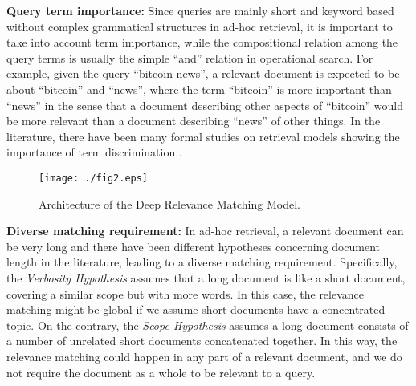 \documentclass{sig-alternate-05-2015}
\begin{document}
\textbf{Query term importance:} Since queries are mainly short and keyword based without complex grammatical structures in ad-hoc retrieval, it is important to take into account term importance, while the compositional relation among the query terms is usually the simple ``and'' relation in operational search. For example, given the query ``bitcoin news'', a relevant document is expected to be about ``bitcoin'' and ``news'', where the term ``bitcoin'' is more important than ``news'' in the sense that a document describing other aspects of ``bitcoin'' would be more relevant than a document describing ``news'' of other things. In the literature, there have been many formal studies on retrieval models showing the importance of term discrimination \cite{fang2004formal,fang2011diagnostic}.

\begin{figure*}[tbp]
\centering
\texttt{[image: ./fig2.eps]}
\caption{Architecture of the Deep Relevance Matching Model.}\label{fig2}
\end{figure*}

\textbf{Diverse matching requirement:} In ad-hoc retrieval, a relevant document can be very long and there have been different hypotheses concerning document length \cite{robertson1994some} in the literature, leading to a diverse matching requirement. Specifically, the \textit{Verbosity Hypothesis} assumes that a long document is like a short document, covering a similar scope but with more words. In this case, the relevance matching might be global if we assume short documents have a concentrated topic. On the contrary, the \textit{Scope Hypothesis} assumes a long document consists of a number of unrelated short documents concatenated together. In this way, the relevance matching could happen in any part of a relevant document, and we do not require the document as a whole to be relevant to a query.
\end{document}
